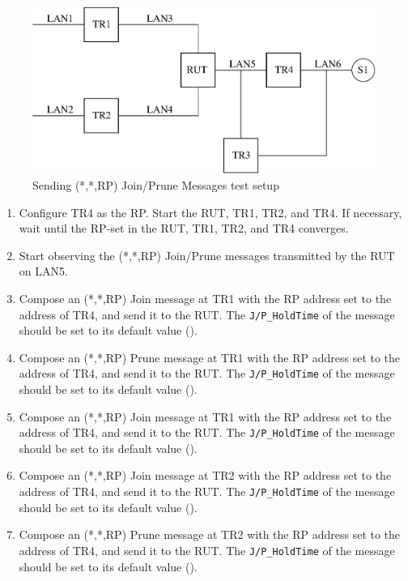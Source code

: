 \documentclass[11pt]{report}
\begin{document}
\begin{figure}[htbp]
  \begin{center}
    \includegraphics[scale=0.8]{figs/pim_test_4_5_sending_rp_join_prune_messages}
    \caption{Sending (*,*,RP) Join/Prune Messages test setup}
    \label{fig:pim_test_4_5_sending_rp_join_prune_messages}
  \end{center}
\end{figure}



\begin{enumerate}

  \item Configure TR4 as the RP. Start the RUT, TR1, TR2, and TR4. If
  necessary, wait until the RP-set in the RUT, TR1, TR2, and TR4
  converges.

  \item Start observing the (*,*,RP) Join/Prune messages transmitted by the
  RUT on LAN5.

  \item Compose an (*,*,RP) Join message at TR1 with the RP address set to the
  address of TR4, and send it to the RUT. 
  The \verb=J/P_HoldTime= of the message should be set to its default
  value ({\PimsmJPHoldTime}).

  \item Compose an (*,*,RP) Prune message at TR1 with the RP address set to the
  address of TR4, and send it to the RUT. 
  The \verb=J/P_HoldTime= of the message should be set to its default
  value ({\PimsmJPHoldTime}).

  \item Compose an (*,*,RP) Join message at TR1 with the RP address set to the
  address of TR4, and send it to the RUT. 
  The \verb=J/P_HoldTime= of the message should be set to its default
  value ({\PimsmJPHoldTime}).

  \item Compose an (*,*,RP) Join message at TR2 with the RP address set to the
  address of TR4, and send it to the RUT. 
  The \verb=J/P_HoldTime= of the message should be set to its default
  value ({\PimsmJPHoldTime}).

  \item Compose an (*,*,RP) Prune message at TR2 with the RP address set to the
  address of TR4, and send it to the RUT. 
  The \verb=J/P_HoldTime= of the message should be set to its default
  value ({\PimsmJPHoldTime}).

\end{enumerate}
\end{document}
